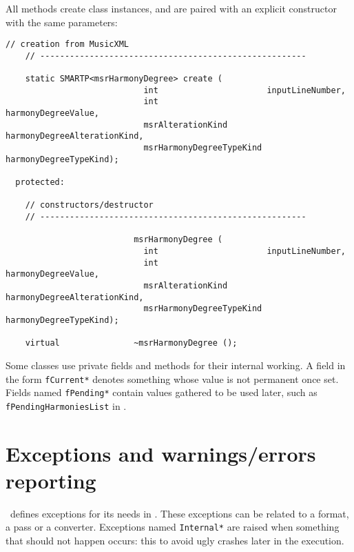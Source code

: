 All  methods create class   instances, and are paired with an explicit constructor with the same parameters:
\begin{lstlisting}[language=CPlusPlus]
    // creation from MusicXML
    // ------------------------------------------------------

    static SMARTP<msrHarmonyDegree> create (
                            int                      inputLineNumber,
                            int                      harmonyDegreeValue,
                            msrAlterationKind        harmonyDegreeAlterationKind,
                            msrHarmonyDegreeTypeKind harmonyDegreeTypeKind);

  protected:

    // constructors/destructor
    // ------------------------------------------------------

                          msrHarmonyDegree (
                            int                      inputLineNumber,
                            int                      harmonyDegreeValue,
                            msrAlterationKind        harmonyDegreeAlterationKind,
                            msrHarmonyDegreeTypeKind harmonyDegreeTypeKind);

    virtual               ~msrHarmonyDegree ();
\end{lstlisting}

Some classes use private fields and methods for their internal working. A field in the form {\tt fCurrent*} denotes something whose value is not permanent once set. Fields named {\tt fPending*} contain values gathered to be used later, such as {\tt fPendingHarmoniesList} in .


\section{Exceptions and warnings/errors reporting}

\mf\ defines exceptions for its needs in . These exceptions can be related to a format, a pass or a converter. Exceptions named {\tt *Internal*} are raised when something that should not happen occurs: this to avoid ugly crashes later in the execution.

